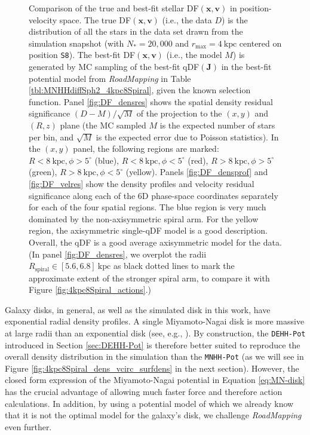 \documentclass[iop,revtex4,numberedappendix,appendixfloats]{emulateapj}
\newcommand{\vect}[1]{\boldsymbol{#1}}
\newcommand{\RM}{{\sl RoadMapping}}
\begin{document}
\begin{figure}[!htbp]
  \caption{Comparison of the true and best-fit stellar DF$(\vect{x},\vect{v})$ in position-velocity space. The true DF$(\vect{x},\vect{v})$ (i.e., the data $D$) is the distribution of all the stars in the data set drawn from the simulation snapshot (with $N_*=20,000$ and $r_\text{max}=4~\text{kpc}$ centered on position \texttt{S8}). The best-fit DF$(\vect{x},\vect{v})$ (i.e., the model $M$) is generated by MC sampling of the best-fit qDF$(\vect{J})$ in the best-fit potential model from \RM{} in Table \ref{tbl:MNHHdiffSph2_4kpc8Spiral}, given the known selection function. Panel \ref{fig:DF_densres} shows the spatial density residual significance $(D-M)/\sqrt{M}$ of the projection to the $(x,y)$ and $(R,z)$ plane (the MC sampled $M$ is the expected number of stars per bin, and $\sqrt{M}$ is the expected error due to Poisson statistics). In the $(x,y)$ panel, the following regions are marked: $R<8~\text{kpc},\phi>5^\circ$ (blue), $R<8~\text{kpc},\phi<5^\circ$ (red), $R>8~\text{kpc},\phi>5^\circ$ (green), $R>8~\text{kpc},\phi<5^\circ$ (yellow). Panels \ref{fig:DF_densprof} and \ref{fig:DF_velres} show the density profiles and velocity residual significance along each of the 6D phase-space coordinates separately for each of the four spatial regions. The blue region is very much dominated by the non-axisymmetric spiral arm. For the yellow region, the axisymmetric single-qDF model is a good description. Overall, the qDF is a good average axisymmetric model for the data. (In panel \ref{fig:DF_densres}, we overplot the radii $R_\text{spiral} \in [5.6,6.8]~\text{kpc}$ as black dotted lines to mark the approximate extent of the stronger spiral arm, to compare it with Figure \ref{fig:4kpc8Spiral_actions}.)}
  \label{fig:4kpc8Spiral_DF_comparison}
\end{figure}

Galaxy disks, in general, as well as the simulated disk in this work, have exponential radial density profiles. A single Miyamoto-Nagai disk is more massive at large radii than an exponential disk (see, e.g., \citealt{2015MNRAS.448.2934S}). By construction, the \texttt{DEHH-Pot} introduced in Section \ref{sec:DEHH-Pot} is therefore better suited to reproduce the overall density distribution in the simulation than the \texttt{MNHH-Pot} (as we will see in Figure \ref{fig:4kpc8Spiral_dens_vcirc_surfdens} in the next section). However, the closed form expression of the Miyamoto-Nagai potential in Equation \eqref{eq:MN-disk} has the crucial advantage of allowing much faster force and therefore action calculations. In addition, by using a potential model of which we already know that it is not the optimal model for the galaxy's disk, we challenge \RM{} even further.
\end{document}
